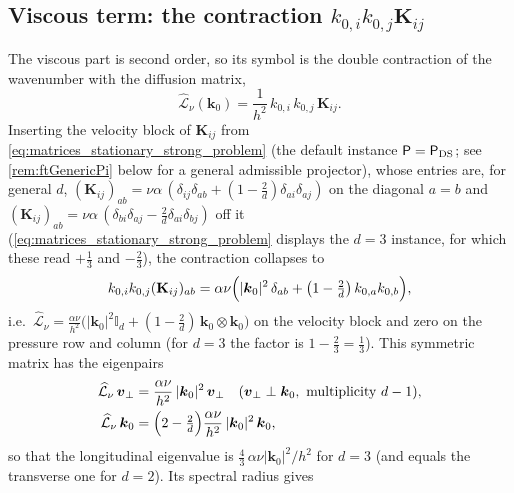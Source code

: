 \subsection{Viscous term: the contraction \texorpdfstring{$k_{0,i}k_{0,j}\mathbf{K}_{ij}$}{k0i k0j Kij}}\label{sec:ftViscous}
The viscous part is second order, so its symbol is the double contraction of the wavenumber with the diffusion matrix,
\begin{equation}\label{eq:ftViscSymbol}
  \widehat{\mathcal{L}}_{\nu}(\boldsymbol{k}_0)
  = \frac{1}{h^2}\, k_{0,i}\,k_{0,j}\,\mathbf{K}_{ij}.
\end{equation}
Inserting the velocity block of $\mathbf{K}_{ij}$ from \cref{eq:matrices_stationary_strong_problem} (the default instance $\mathsf{P}=\mathsf{P}_{\mathrm{DS}}$; see \cref{rem:ftGenericPi} below for a general admissible projector), whose entries are, for general $d$, $(\mathbf{K}_{ij})_{ab}=\nu\alpha\,(\delta_{ij}\delta_{ab}+(1-\tfrac{2}{d})\delta_{ai}\delta_{aj})$ on the diagonal $a=b$ and $(\mathbf{K}_{ij})_{ab}=\nu\alpha\,(\delta_{bi}\delta_{aj}-\tfrac{2}{d}\delta_{ai}\delta_{bj})$ off it (\cref{eq:matrices_stationary_strong_problem} displays the $d=3$ instance, for which these read $+\tfrac13$ and $-\tfrac23$), the contraction collapses to
\begin{equation}\label{eq:ftViscClosed}
  k_{0,i}k_{0,j}(\mathbf{K}_{ij})_{ab}
   = \alpha\nu\Bigl(|\boldsymbol{k}_0|^2\,\delta_{ab} + \bigl(1-\tfrac{2}{d}\bigr)\,k_{0,a}k_{0,b}\Bigr),
\end{equation}
i.e.\ $\widehat{\mathcal{L}}_{\nu}=\frac{\alpha\nu}{h^2}\bigl(|\boldsymbol{k}_0|^2\mathbb{I}_d+(1-\tfrac{2}{d})\,\boldsymbol{k}_0\otimes\boldsymbol{k}_0\bigr)$ on the velocity block and zero on the pressure row and column (for $d=3$ the factor is $1-\tfrac23=\tfrac13$). This symmetric matrix has the eigenpairs
\begin{equation}\label{eq:ftViscEig}
  \begin{aligned}
    \widehat{\mathcal{L}}_{\nu}\,\boldsymbol{v}_\perp &= \frac{\alpha\nu}{h^2}\,|\boldsymbol{k}_0|^2\,\boldsymbol{v}_\perp
    \quad(\boldsymbol{v}_\perp\perp\boldsymbol{k}_0,\ \text{multiplicity }d-1), \\
    \widehat{\mathcal{L}}_{\nu}\,\boldsymbol{k}_0 &= \Bigl(2-\tfrac{2}{d}\Bigr)\frac{\alpha\nu}{h^2}\,|\boldsymbol{k}_0|^2\,\boldsymbol{k}_0,
  \end{aligned}
\end{equation}
so that the longitudinal eigenvalue is $\tfrac43\,\alpha\nu|\boldsymbol{k}_0|^2/h^2$ for $d=3$ (and equals the transverse one for $d=2$). Its spectral radius gives
